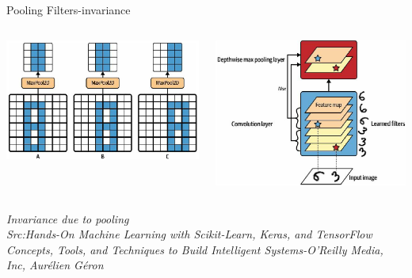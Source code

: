 \begin{frame}{Pooling Filters-invariance}
	\begin{columns}[T]
		\begin{column}{0.5\textwidth}
        	\includegraphics[width=\textwidth]{images/inv ex.png} 
        \end{column}
        \begin{column}{0.5\textwidth}
        	\includegraphics[width=\textwidth]{images/pooling_inv.png}
        \end{column}
    \end{columns}
	\tiny{\textit{Invariance due to pooling\\ Src:Hands-On Machine Learning with Scikit-Learn, Keras, and TensorFlow  Concepts, Tools, and Techniques to Build Intelligent Systems-O'Reilly Media, Inc, Aurélien Géron}}
\end{frame}


